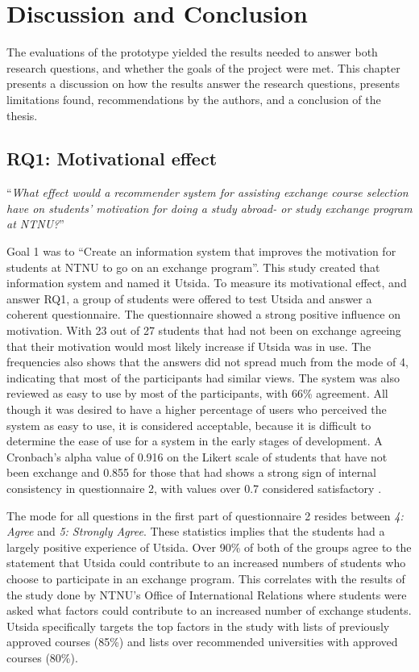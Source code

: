 \chapter{Discussion and Conclusion}

The evaluations of the prototype yielded the results needed to answer both research questions, and whether the goals of the project were met. This chapter presents a discussion on how the results answer the research questions, presents limitations found, recommendations by the authors, and a conclusion of the thesis.

\section{RQ1: Motivational effect}

\enquote{\textit{What effect would a recommender system for assisting exchange course selection have on students' motivation for doing a study abroad- or study exchange program at NTNU?}}

Goal 1 was to \enquote{Create an information system that improves the motivation for students at NTNU to go on an exchange program}. This study created that information system and named it Utsida. To measure its motivational effect, and answer RQ1, a group of students were offered to test Utsida and answer a coherent questionnaire. The questionnaire showed a strong positive influence on motivation. With 23 out of 27 students that had not been on exchange agreeing that their motivation would most likely increase if Utsida was in use. The frequencies also shows that the answers did not spread much from the mode of 4, indicating that most of the participants had similar views. The system was also reviewed as easy to use by most of the participants, with 66\% agreement. All though it was desired to have a higher percentage of users who perceived the system as easy to use, it is considered acceptable, because it is difficult to determine the ease of use for a system in the early stages of development. A Cronbach's alpha value of 0.916 on the Likert scale of students that have not been exchange and 0.855 for those that had shows a strong sign of internal consistency in questionnaire 2, with values over 0.7 considered satisfactory \cite{bland1997statistics}.

The mode for all questions in the first part of questionnaire 2 resides between \textit{4: Agree} and \textit{5: Strongly Agree}. These statistics implies that the students had a largely positive experience of Utsida. Over 90\% of both of the groups agree to the statement that Utsida could contribute to an increased numbers of students who choose to participate in an exchange program. This correlates with the results of the study \cite{intersek_report} done by NTNU's Office of International Relations where students were asked what factors could contribute to an increased number of exchange students. Utsida specifically targets the top factors in the study with lists of previously approved courses (85\%) and lists over recommended universities with approved courses (80\%).

